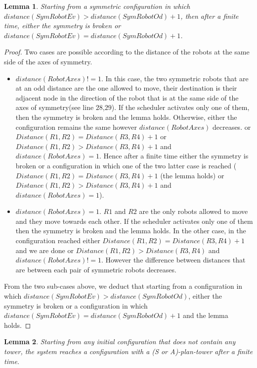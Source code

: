 \documentclass[12pt]{llncs}
\newtheorem{lem}{Lemma}
\begin{document}
\begin{lem}
\label{lem:EvbOd}
Starting from a symmetric configuration in which $distance(SymRobotEv)>distance(SymRobotOd)+1$, then after a finite time, either the symmetry is broken or $distance(SymRobotEv)=distance(SymRobotOd)+1$.  
\end{lem}

\begin{proof} Two cases are possible according to the distance of the robots at the same side of the axes of symmetry.
\begin{itemize}
\item{$distance(RobotAxes)!=1$. In this case, the two symmetric robots that are at an odd distance are the one allowed to move, their destination is their adjacent node in the direction of the robot that is at the same side of the axes of symmetry(see line $28$,$29$). If the scheduler activates only one of them, then the symmetry is broken and the lemma holds. Otherwise, either the configuration remains the same however $distance(RobotAxes)$ decreases. or $Distance(R1,R2)= Distance(R3,R4)+1$ or $Distance(R1,R2)>Distance(R3,R4)+1$ and $distance(RobotAxes)=1$. Hence after a finite time either the symmetry is broken or a configuration in which one of the two latter case is reached ($Distance(R1,R2)= Distance(R3,R4)+1$ (the lemma holds) or $Distance(R1,R2)>Distance(R3,R4)+1$ and $distance(RobotAxes)=1$).} 
\item{$distance(RobotAxes)=1$. $R1$ and $R2$ are the only robots allowed to move and they move towards each other. If the scheduler activates only one of them then the symmetry is broken and the lemma holds. In the other case, in the configuration reached either $Distance(R1,R2)= Distance(R3,R4)+1$ and we are done or $Distance(R1,R2)>Distance(R3,R4)$ and $distance(RobotAxes)!=1$. However the difference between distances that are between each pair of symmetric robots decreases.}  
\end{itemize}
From the two sub-cases above, we deduct that starting from a configuration in which $distance(SymRobotEv)>distance(SymRobotOd)$, either the symmetry is broken or a configuration in which $distance(SymRobotEv)= distance(SymRobotOd)+1$ and the lemma holds.  
\end{proof}




\begin{lem}
\label{lem:PH1}
Starting from any initial configuration that does not contain any tower, the system reaches a configuration with a (S or A)-plan-tower after a finite time.
\end{lem}
\end{document}
